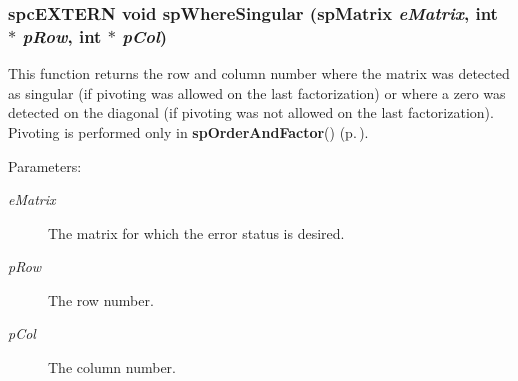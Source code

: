 \subsubsection{\setlength{\rightskip}{0pt plus 5cm}spc\-EXTERN void sp\-Where\-Singular ({\bf sp\-Matrix} {\em e\-Matrix}, int $\ast$ {\em p\-Row}, int $\ast$ {\em p\-Col})}\label{spMatrix_8h_a55}


This function returns the row and column number where the matrix was detected as singular (if pivoting was allowed on the last factorization) or where a zero was detected on the diagonal (if pivoting was not allowed on the last factorization). Pivoting is performed only in {\bf sp\-Order\-And\-Factor}() {\rm (p.\,\pageref{spMatrix_8h_a46})}.\begin{Desc}
\item[Parameters: ]\par
\begin{description}
\item[{\em 
e\-Matrix}]The matrix for which the error status is desired. \item[{\em 
p\-Row}]The row number. \item[{\em 
p\-Col}]The column number. \end{description}
\end{Desc}
